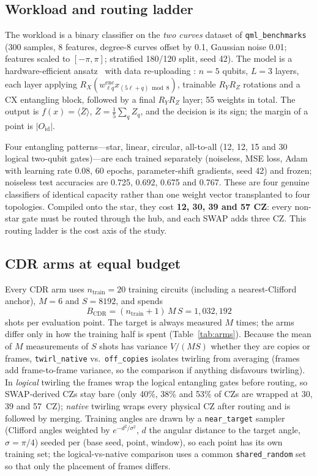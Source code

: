 \documentclass[conference]{IEEEtran}
\newcommand{\ev}[1]{\langle #1\rangle}
\newcommand{\Oid}{O_{\mathrm{id}}}
\newcommand{\arm}[1]{\texttt{#1}}
\begin{document}
\subsection{Workload and routing ladder}
The workload is a binary classifier on the \emph{two curves} dataset of
\texttt{qml\_benchmarks}~\cite{bowles2024} (300 samples, 8 features, degree-8 curves offset by
0.1, Gaussian noise 0.01; features scaled to $[-\pi,\pi]$; stratified 180/120 split, seed 42).
The model is a hardware-efficient ansatz~\cite{kandala2017} with data re-uploading
\cite{perezsalinas2020,schuld2021}: $n=5$ qubits, $L=3$ layers, each layer applying
$R_X(w^{\text{enc}}_{\ell q}x_{(5\ell+q)\bmod 8})$, trainable $R_YR_Z$ rotations and a CX
entangling block, followed by a final $R_YR_Z$ layer; 55 weights in total. The output is
$f(x)=\ev{\bar Z}$, $\bar Z=\frac15\sum_qZ_q$, and the decision is its sign; the margin of a point
is $|\Oid|$.

Four entangling patterns---star, linear, circular, all-to-all (12, 12, 15 and 30 logical
two-qubit gates)---are each trained separately (noiseless, MSE loss, Adam with learning rate
0.08, 60 epochs, parameter-shift gradients, seed 42) and frozen; noiseless test accuracies are
0.725, 0.692, 0.675 and 0.767. These are four genuine classifiers of identical capacity rather
than one weight vector transplanted to four topologies. Compiled onto the star, they cost
\textbf{12, 30, 39 and 57 CZ}: every non-star gate must be routed through the hub, and each SWAP
adds three CZ. This routing ladder is the cost axis of the study.

\subsection{CDR arms at equal budget}
Every CDR arm uses $n_{\text{train}}=20$ training circuits (including a nearest-Clifford
anchor), $M=6$ and $S=8192$, and spends
\begin{equation}
  B_{\text{CDR}}=(n_{\text{train}}+1)\,M\,S=1{,}032{,}192
\end{equation}
shots per evaluation point.
The target is always measured $M$ times; the arms differ only in how the training half is
spent (Table~\ref{tab:arms}). Because the mean of $M$ measurements of $S$ shots has variance
$V/(MS)$ whether they are copies or frames, \arm{twirl\_native} vs.\ \arm{off\_copies}
isolates twirling from averaging (frames add frame-to-frame variance, so the comparison if
anything disfavours twirling). In \emph{logical} twirling the frames wrap the logical
entangling gates before routing, so SWAP-derived CZs stay bare (only 40\%, 38\% and 53\% of CZs
are wrapped at 30, 39 and 57~CZ); \emph{native} twirling wraps every physical CZ after routing
and is followed by merging. Training angles are drawn by a \arm{near\_target} sampler
(Clifford angles weighted by $e^{-d^2/\sigma^2}$, $d$ the angular distance to the target angle,
$\sigma=\pi/4$) seeded per (base seed, point, window), so each point has its own training set;
the logical-vs-native comparison uses a common \arm{shared\_random} set so that only the
placement of frames differs.
\end{document}

